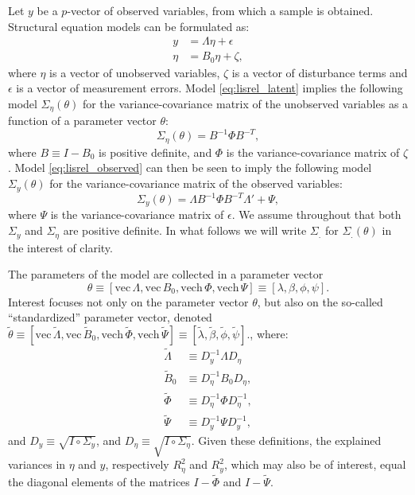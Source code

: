 \documentclass[a4paper,11pt]{article}
\newcommand{\n}{\eta}
\renewcommand{\l}{\lambda}
\newcommand{\definedas}{\equiv}
\newcommand{\hadaprod}{\circ}
\renewcommand{\vec}{\mathrm{vec}\,}
\newcommand{\vech}{\mathrm{vech}\,}
\newcommand{\Lambdastan}{\tilde{\Lambda}}
\newcommand{\Bstan}{\tilde{B}}
\newcommand{\Phistan}{\tilde{\Phi}}
\newcommand{\Psistan}{\tilde{\Psi}}
\newcommand{\thetastan}{\tilde{\theta}}
\newcommand{\0}{\boldsymbol{0}}
\begin{document}
Let $y$ be a $p$-vector of observed variables, from which a sample is obtained.
Structural equation models can be formulated as:
\begin{align}
\label{eq:lisrel_observed}
y &= \Lambda \n + \epsilon\\
\n &= B_0 \n + \zeta,\label{eq:lisrel_latent}
\end{align}
where $\n$ is a vector of unobserved variables, $\zeta$ is a vector of
disturbance terms and $\epsilon$ is a vector of measurement errors. Model
\ref{eq:lisrel_latent} implies the following model
$\Sigma_\n(\theta)$ for the variance-covariance matrix of the unobserved
variables as a function of a parameter vector $\theta$: 
\begin{equation}\label{eq:sigma_n}
    \Sigma_\n(\theta) = B^{-1} \Phi B^{-T},
\end{equation}
where $B \definedas I - B_0$ is positive definite, 
and $\Phi$ is the variance-covariance
matrix of $\zeta$. Model \ref{eq:lisrel_observed} can then be seen to imply the
following model $\Sigma_y(\theta)$ for the variance-covariance matrix of the
observed variables:
\begin{equation}\label{eq:sigma_y}
    \Sigma_y(\theta) = \Lambda B^{-1} \Phi B^{-T} \Lambda' + \Psi,
\end{equation}
where  $\Psi$ is the variance-covariance matrix of $\epsilon$. 
We assume throughout that both $\Sigma_y$ and $\Sigma_\n$ are positive
definite. In what follows we will write $\Sigma_.$ for $\Sigma_.(\theta)$ in
the interest of clarity.

The parameters of the model are collected in a parameter
vector 
$$
\theta \definedas [\vec{\Lambda},  \vec B_0, \vech{\Phi}, \vech
\Psi] 
\definedas [\l, \beta, \phi, \psi].
$$
Interest focuses not only on the parameter vector $\theta$, 
but also on the so-called ``standardized'' parameter vector, denoted
$\thetastan \definedas [\vec\Lambdastan, \vec\Bstan_0, \vech\Phistan, \vech\Psistan] 
\definedas [\tilde\l, \tilde\beta, \tilde\phi, \tilde\psi].
$, where:
\begin{align}\label{eq:lambda_s}
    \Lambdastan &\definedas D^{-1}_y \Lambda D_\n
    \\
    \Bstan_0 &\definedas D^{-1}_\n B_0 D_\n,\label{eq:beta_s}
    \\
    \Phistan  &\definedas D^{-1}_\n \Phi D^{-1}_\n,\label{eq:phi_s}
    \\
        \Psistan  &\definedas D^{-1}_y \Psi D^{-1}_y\label{eq:psi_s},
\end{align}
and $D_y \definedas \sqrt{I \hadaprod \Sigma_y}$, and 
$D_\n \definedas \sqrt{I \hadaprod \Sigma_\n}$. 
Given these definitions, the explained variances in $\n$ and $y$, respectively $R^2_\n$ and $R^2_y$, 
which may also be of interest,  equal the diagonal elements of the matrices $I - \tilde\Phi$ and $I - \tilde\Psi$. 
\end{document}
